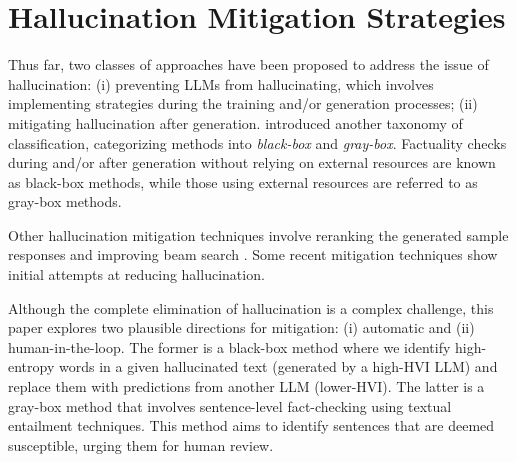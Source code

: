 \section{Hallucination Mitigation Strategies}
\label{sec:mitigation}
\vspace{-1mm}
Thus far, two classes of approaches have been proposed to address the issue of hallucination: (i) preventing LLMs from hallucinating, which involves implementing strategies during the training and/or generation processes; (ii) mitigating hallucination after generation. 
\cite{manakul2023selfcheckgpt} introduced another taxonomy of classification, categorizing methods into \emph{black-box} and \emph{gray-box}. 
Factuality checks during and/or after generation without relying on external resources are known as black-box methods, while those using external resources are referred to as gray-box methods.

Other hallucination mitigation techniques involve reranking the generated sample responses \cite{dale2022detecting} and improving beam search \cite{sridhar2022improved}. Some recent mitigation techniques \cite{li2023halueval,mündler2023selfcontradictory,pfeiffer2023mmt5,chen2023purr,zhang2023mitigating,zhang2023language,ladhak-etal-2023-pre,manakul2023selfcheckgpt,agrawal2023language} show initial attempts at reducing hallucination. %

Although the complete elimination of hallucination is a complex challenge, this paper explores two plausible directions for mitigation: (i) automatic and (ii) human-in-the-loop. The former is a black-box method where we identify high-entropy words in a given hallucinated text (generated by a high-HVI LLM) and replace them with predictions from another LLM (lower-HVI). The latter is a gray-box method that involves sentence-level fact-checking using textual entailment techniques. This method aims to identify sentences that are deemed susceptible, urging them for human review.


